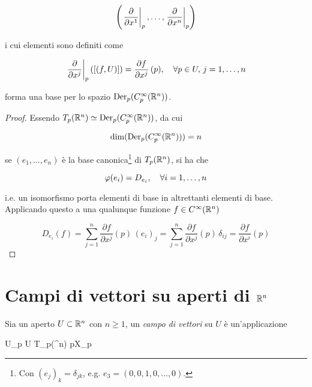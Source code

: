 \begin{equation}
	\left( \eval{ \pdv{x^{1}} }_{p}, \dots, \eval{ \pdv{x^{n}} }_{p}  \right)
\end{equation}

i cui elementi sono definiti come

\begin{equation}
	\eval{ \pdv{x^{j}} }_{p} ([(f,U)]) = \pdv{f}{x^{j}} \, (p) \qcomma \forall p \in U, \, j = 1, \dots, n
\end{equation}

forma una base per lo spazio $ \operatorname{Der}_{p}(C_{p}^{\infty}(\mathbb{R}^{n})) $.

\begin{proof}
	Essendo $ T_{p}(\mathbb{R}^{n}) \simeq \operatorname{Der}_{p}(C_{p}^{\infty}(\mathbb{R}^{n})) $, da cui
	
	\begin{equation}
		\dim ( \operatorname{Der}_{p}(C_{p}^{\infty}(\mathbb{R}^{n})) ) = n
	\end{equation}
	
	se $ (e_{1},\dots,e_{n}) $ è la base canonica\footnote{%
		Con $ (e_{j})_{k} = \delta_{jk} $, e.g. $ e_{3} = (0,0,1,0,\dots,0) $.%
	} di $ T_{p}(\mathbb{R}^{n}) $, si ha che

	\begin{equation}
		\varphi(e_{i}) = D_{e_{i}} \qcomma \forall i=1,\dots,n
	\end{equation}

	i.e. un isomorfismo porta elementi di base in altrettanti elementi di base. \\
	Applicando questo a una qualunque funzione $ f \in C^{\infty} (\mathbb{R}^{n}) $
	
	\begin{equation}
		D_{e_{i}} (f) = \sum_{j=1}^{n} \dfrac{\partial f}{\partial x^{j}} (p) \, (e_{i})_{j} = \sum_{j=1}^{n} \dfrac{\partial f}{\partial x^{j}} (p) \, \delta_{ij} = \dfrac{\partial f}{\partial x^{i}} (p)
	\end{equation}
\end{proof}

\section{Campi di vettori su aperti di $ \mathbb{R}^{n} $}

Sia un aperto $ U \subset \mathbb{R}^{n} $ con $ n \geqslant 1 $, un \textit{campo di vettori} su $ U $ è un'applicazione

	{U}{\bigsqcup_{p \in U} T_{p}(\R^{n})}
	{p}{X_{p}}

